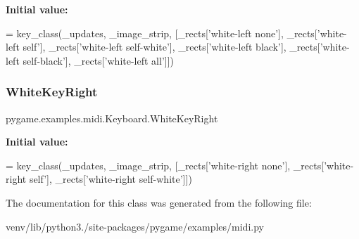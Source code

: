 {\bfseries Initial value\+:}
\begin{DoxyCode}
=  key\_class(\_updates,
                             \_image\_strip,
                             [\_rects[\textcolor{stringliteral}{'white-left none'}],
                              \_rects[\textcolor{stringliteral}{'white-left self'}],
                              \_rects[\textcolor{stringliteral}{'white-left self-white'}],
                              \_rects[\textcolor{stringliteral}{'white-left black'}],
                              \_rects[\textcolor{stringliteral}{'white-left self-black'}],
                              \_rects[\textcolor{stringliteral}{'white-left all'}]])
\end{DoxyCode}
\mbox{\label{classpygame_1_1examples_1_1midi_1_1_keyboard_a671996ec5856019f5034eed7064af4c7}} 
\subsubsection{\texorpdfstring{White\+Key\+Right}{WhiteKeyRight}}
{\footnotesize\ttfamily pygame.\+examples.\+midi.\+Keyboard.\+White\+Key\+Right\hspace{0.3cm}{\ttfamily [static]}}

{\bfseries Initial value\+:}
\begin{DoxyCode}
=  key\_class(\_updates,
                              \_image\_strip,
                              [\_rects[\textcolor{stringliteral}{'white-right none'}],
                               \_rects[\textcolor{stringliteral}{'white-right self'}],
                               \_rects[\textcolor{stringliteral}{'white-right self-white'}]])
\end{DoxyCode}


The documentation for this class was generated from the following file\+:\begin{DoxyCompactItemize}
\item 
venv/lib/python3./site-\/packages/pygame/examples/midi.\+py\end{DoxyCompactItemize}
